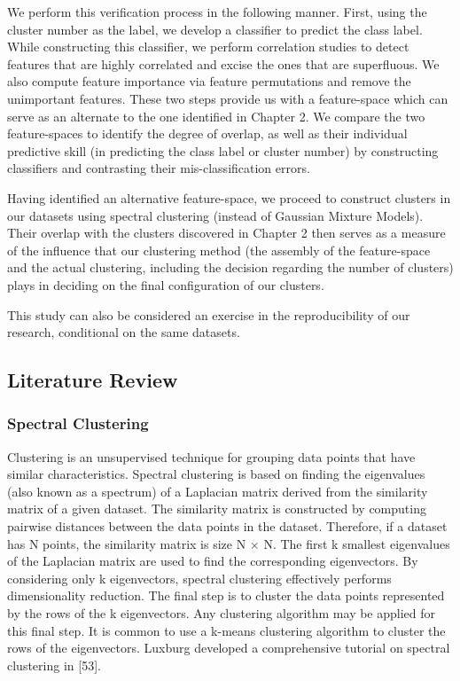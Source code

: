 We perform this veriﬁcation process in the following manner. First, using the cluster number as the label, we develop a classiﬁer to predict the class label. While constructing this classiﬁer, we perform correlation studies to detect features that are highly correlated and excise the ones that are superﬂuous. We also compute feature importance via feature permutations and remove the unimportant features. These two steps provide us with a feature-space which can serve as an alternate to the one identiﬁed in Chapter 2. We compare the two feature-spaces to identify the degree of overlap, as well as their individual predictive skill (in predicting the class label or cluster number) by constructing classiﬁers and contrasting their mis-classiﬁcation errors.

Having identiﬁed an alternative feature-space, we proceed to construct clusters in our datasets using
spectral clustering (instead of Gaussian Mixture Models). Their overlap with the clusters discovered in
Chapter 2 then serves as a measure of the inﬂuence that our clustering method (the assembly of the
feature-space and the actual clustering, including the decision regarding the number of clusters) plays in
deciding on the ﬁnal conﬁguration of our clusters.

This study can also be considered an exercise in the reproducibility of our research, conditional on the
same datasets.

\subsection{Literature Review}

\subsubsection{Spectral Clustering}

Clustering is an unsupervised technique for grouping data points that have similar characteristics. Spectral
clustering is based on ﬁnding the eigenvalues (also known as a spectrum) of a Laplacian matrix derived
from the similarity matrix of a given dataset. The similarity matrix is constructed by computing pairwise
distances between the data points in the dataset. Therefore, if a dataset has N points, the similarity matrix is
size N × N. The ﬁrst k smallest eigenvalues of the Laplacian matrix are used to ﬁnd the corresponding
eigenvectors. By considering only k eigenvectors, spectral clustering effectively performs dimensionality
reduction. The ﬁnal step is to cluster the data points represented by the rows of the k eigenvectors. Any
clustering algorithm may be applied for this ﬁnal step. It is common to use a k-means clustering algorithm
to cluster the rows of the eigenvectors. Luxburg developed a comprehensive tutorial on spectral clustering
in [53].

